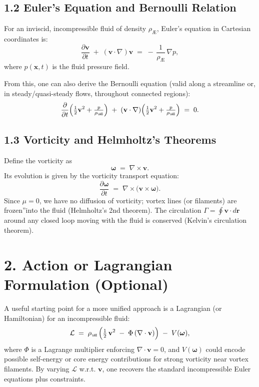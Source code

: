 \subsection*{1.2 Euler's Equation and Bernoulli Relation}
For an inviscid, incompressible fluid of density \(\rho_{\scriptscriptstyle \mathrm{Æ}}\), Euler's equation in Cartesian coordinates is:
\[
 \frac{\partial \mathbf{v}}{\partial t} \;+\; (\mathbf{v}\cdot\nabla)\mathbf{v} \;=\; -\,\frac{1}{\rho_{\scriptscriptstyle \mathrm{Æ}}}\,\nabla p,
\]
where \(p(\mathbf{x},t)\) is the fluid pressure field.

From this, one can also derive the Bernoulli equation (valid along a streamline or, in steady/quasi-steady flows, throughout connected regions):
\[
 \frac{\partial}{\partial t} \Bigl( \tfrac12 \mathbf{v}^2 + \tfrac{p}{\rho_{\scriptscriptstyle \mathrm{Æ}}} \Bigr) \;+\; (\mathbf{v}\cdot\nabla) \Bigl( \tfrac12 \mathbf{v}^2 + \tfrac{p}{\rho_{\scriptscriptstyle \mathrm{Æ}}} \Bigr) \;=\; 0.
\]

\subsection*{1.3 Vorticity and Helmholtz's Theorems}
Define the vorticity as
\[
 \boldsymbol{\omega} \;=\; \nabla \times \mathbf{v}.
\]
Its evolution is given by the vorticity transport equation:
\[
 \frac{\partial \boldsymbol{\omega}}{\partial t} \;=\; \nabla\times\bigl(\mathbf{v}\times\boldsymbol{\omega}\bigr).
\]
Since \(\mu=0\), we have no diffusion of vorticity; vortex lines (or filaments) are \grqq frozen\textquotedblright into the fluid (Helmholtz's 2nd theorem). The circulation \(\Gamma = \oint \mathbf{v}\cdot d\mathbf{r}\) around any closed loop moving with the fluid is conserved (Kelvin's circulation theorem).

\section*{2. Action or Lagrangian Formulation (Optional)}
A useful starting point for a more unified approach is a Lagrangian (or Hamiltonian) for an incompressible fluid:
\[
 \mathcal{L} \;=\; \rho_{\scriptscriptstyle \mathrm{Æ}}\, \Bigl( \tfrac12\,\mathbf{v}^2 \;-\; \Phi\,(\nabla\cdot\mathbf{v}) \Bigr) \;-\; V(\boldsymbol{\omega}),
\]
where \(\Phi\) is a Lagrange multiplier enforcing \(\nabla\cdot \mathbf{v}=0\), and \(V(\boldsymbol{\omega})\) could encode possible self-energy or core energy contributions for strong vorticity near vortex filaments. By varying \(\mathcal{L}\) w.r.t. \(\mathbf{v}\), one recovers the standard incompressible Euler equations plus constraints.

